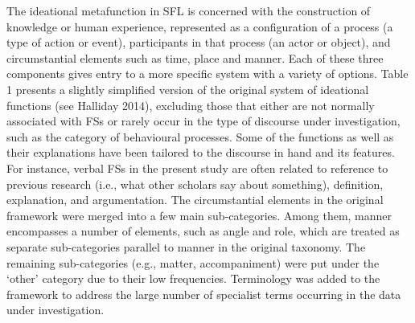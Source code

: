 \begin{styleStandard}
The ideational metafunction in SFL is concerned with the construction of knowledge or human experience, represented as a configuration of a process (a type of action or event), participants in that process (an actor or object), and circumstantial elements such as time, place and manner. Each of these three components gives entry to a more specific system with a variety of options. Table 1 presents a slightly simplified version of the original system of ideational functions (see Halliday 2014), excluding those that either are not normally associated with FSs or rarely occur in the type of discourse under investigation, such as the category of behavioural processes. Some of the functions as well as their explanations have been tailored to the discourse in hand and its features. For instance, verbal FSs in the present study are often related to reference to previous research (i.e., what other scholars say about something), definition, explanation, and argumentation. The circumstantial elements in the original framework were merged into a few main sub-categories. Among them, manner encompasses a number of elements, such as angle and role, which are treated as separate sub-categories parallel to manner in the original taxonomy. The remaining sub-categories (e.g., matter, accompaniment) were put under the ‘other’ category due to their low frequencies. Terminology was added to the framework to address the large number of specialist terms occurring in the data under investigation.
\end{styleStandard}

